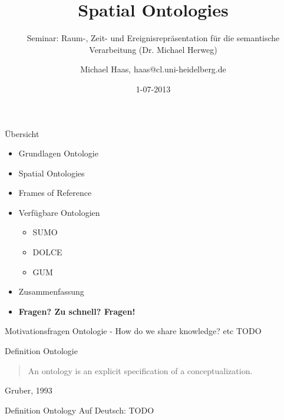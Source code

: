 \documentclass[12pt,a4paper]{beamer}
\author{Michael Haas, haas@cl.uni-heidelberg.de}
\title{Spatial Ontologies}
\subtitle{Seminar: Raum-, Zeit- und Ereignisrepräsentation für die semantische Verarbeitung (Dr. Michael Herweg)}
\date{1-07-2013}
\begin{document}
\begin{frame}
\maketitle
\end{frame}

\begin{frame}{Übersicht}
\begin{itemize}
\item Grundlagen Ontologie
\item Spatial Ontologies
\item Frames of Reference
\item Verfügbare Ontologien
\begin{itemize}
    \item SUMO
    \item DOLCE
    \item GUM
\end{itemize}
\item Zusammenfassung 
\item \textbf{Fragen? Zu schnell? Fragen!}
\end{itemize}
\end{frame}


\begin{frame}{Motivationsfragen Ontologie}
 - How do we share knowledge? etc TODO
\end{frame}





\begin{frame}{Definition Ontologie}
\begin{quote}
An ontology is an explicit specification of a conceptualization.
\end{quote}
Gruber, 1993
\end{frame}

\begin{frame}{Definition Ontology}
Auf Deutsch: TODO
\end{frame}


\end{document}
